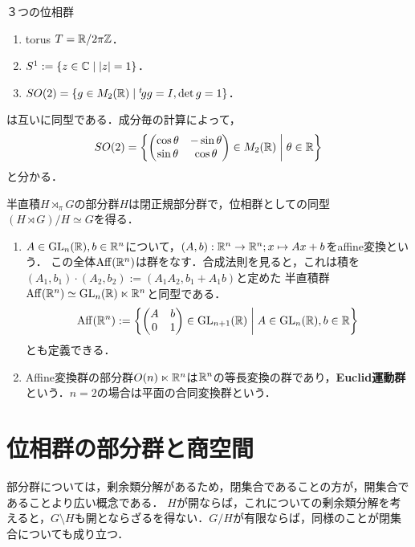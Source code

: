 \documentclass[uplatex,dvipdfmx]{jsreport}
\begin{document}
\begin{example}
    ３つの位相群
    \begin{enumerate}
        \item torus $T=\mathbb{R}/2\pi\mathbb{Z}$．
        \item $S^1:=\left\{z\in\mathbb{C}\mid\lvert z\rvert=1\right\}$．
        \item $SO(2)=\left\{g\in M_2(\mathbb{R})\mid {}^t\!gg=I,\det g=1\right\}$．
    \end{enumerate}
    は互いに同型である．成分毎の計算によって，
    \[SO(2)=\left\{\begin{pmatrix}\cos\theta&-\sin\theta\\\sin\theta&\cos\theta\end{pmatrix}\in M_2(\mathbb{R})\;\middle|\;\theta\in\mathbb{R}\right\}\]
    と分かる．
\end{example}

\begin{example}[半直積]
    半直積$H\rtimes_\pi G$の部分群$H$は閉正規部分群で，位相群としての同型$(H\rtimes G)/H\simeq G$を得る．
\end{example}

\begin{example}[Affine変換群とEuclid運動群]\mbox{}\label{exp-Affine-transformation-and-Euclid-motion-group}
    \begin{enumerate}
        \item 
    $A\in\mathrm{GL}_n(\mathbb{R}),b\in\mathbb{R}^n$について，$(A,b):\mathbb{R}^n\to\mathbb{R}^n;x\mapsto Ax+b$をaffine変換という．
    この全体$\mathrm{Aff}(\mathbb{R}^n)$は群をなす．合成法則を見ると，これは積を$(A_1,b_1)\cdot(A_2,b_2):=(A_1A_2,b_1+A_1b)$と定めた
    半直積群$\mathrm{Aff}(\mathbb{R}^n)\simeq\mathrm{GL}_n(\mathbb{R})\ltimes\mathbb{R}^n$と同型である．
    \[\mathrm{Aff}(\mathbb{R}^n):=\left\{\begin{pmatrix}A&b\\0&1\end{pmatrix}\in\mathrm{GL}_{n+1}(\mathbb{R})\;\middle|\;A\in\mathrm{GL}_n(\mathbb{R}),b\in\mathbb{R}\right\}\]
    とも定義できる．
    \item Affine変換群の部分群$O(n)\ltimes\mathbb{R}^n$は$\mathbb{R}^n$の等長変換の群であり，\textbf{Euclid運動群}という．$n=2$の場合は平面の合同変換群という．
    \end{enumerate}
\end{example}

\section{位相群の部分群と商空間}

\begin{tcolorbox}[colframe=ForestGreen, colback=ForestGreen!10!white,breakable,colbacktitle=ForestGreen!40!white,coltitle=black,fonttitle=\bfseries\sffamily,
title=]
    部分群については，剰余類分解があるため，閉集合であることの方が，開集合であることより広い概念である．
    $H$が開ならば，これについての剰余類分解を考えると，$G\setminus H$も開とならざるを得ない．$G/H$が有限ならば，同様のことが閉集合についても成り立つ．
\end{tcolorbox}
\end{document}
